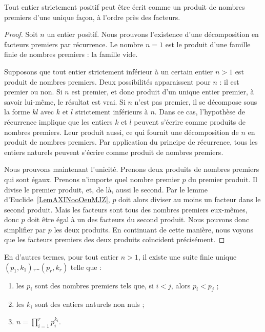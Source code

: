 \begin{theorem}        \label{ThoAJFJooAveRvY}
    Tout entier strictement positif peut être écrit comme un produit de nombres premiers d'une unique façon, à l'ordre près des facteurs.
\end{theorem}

\begin{proof}

    Soit \( n\) un entier positif. Nous prouvons l'existence d'une décomposition en facteurs premiers par récurrence. Le nombre \( n=1\) est le produit d'une famille finie de nombres premiers : la famille vide.

    Supposons que tout entier strictement inférieur à un certain entier \( n>1\) est produit de nombres premiers. Deux possibilités apparaissent pour $n$ : il est premier ou non. Si $n$ est premier, et donc produit d'un unique entier premier, à savoir lui-même, le résultat est vrai. Si \( n\) n'est pas premier, il se décompose sous la forme $kl$ avec $k$ et $l$ strictement inférieurs à $n$. Dans ce cas, l'hypothèse de récurrence implique que les entiers $k$ et $l$ peuvent s'écrire comme produits de nombres premiers. Leur produit aussi, ce qui fournit une décomposition de $n$ en produit de nombres premiers.  Par application du principe de récurrence, tous les entiers naturels peuvent s'écrire comme produit de nombres premiers.

    Nous prouvons maintenant l'unicité. Prenons deux produits de nombres premiers qui sont égaux. Prenons n'importe quel nombre premier $p$ du premier produit. Il divise le premier produit, et, de là, aussi le second. Par le lemme d'Euclide~\ref{LemAXINooOeuMJZ}, $p$ doit alors diviser au moins un facteur dans le second produit. Mais les facteurs sont tous des nombres premiers eux-mêmes, donc $p$ doit être égal à un des facteurs du second produit. Nous pouvons donc simplifier par $p$ les deux produits. En continuant de cette manière, nous voyons que les facteurs premiers des deux produits coïncident précisément.
\end{proof}

En d'autres termes, pour tout entier \( n>1\), il existe une suite finie unique $(p_1, k_1)$,\ldots $(p_r, k_r)$ telle que :
\begin{enumerate}
    \item
les \( p_i\) sont des nombres premiers tels que, si $i < j$, alors $p_i < p_j$ ;
\item
les \( k_i\) sont des entiers naturels non nuls ;
\item
    \( n=\prod_{i=1}^rp_i^{k_i}\).
\end{enumerate}

